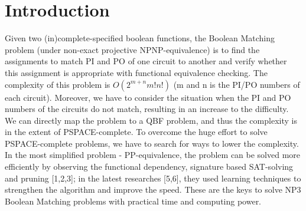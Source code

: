\section{Introduction}
Given two (in)complete-specified boolean functions,
the Boolean Matching problem (under non-exact projective NPNP-equivalence) is to find the assignments to match PI and PO of one circuit to another and verify whether this assignment is appropriate with functional equivalence checking. The complexity of this problem is $O(2^{m+n}m!n!)$ (m and n is the PI/PO numbers of each circuit). Moreover, we have to consider the situation when the PI and PO numbers of the circuits do not match, resulting in an increase to the difficulty. We can directly map the problem to a QBF problem, and thus the complexity is in the extent of PSPACE-complete. To overcome the huge effort to solve PSPACE-complete problems, we have to search for ways to lower the complexity. In the most simplified problem - PP-equivalence, the problem can be solved more efficiently by observing the functional dependency, signature based SAT-solving and pruning [1,2,3]; in the latest researches [5,6], they used learning techniques to strengthen the algorithm and improve the speed. These are the keys to solve NP3 Boolean Matching problems with practical time and computing power.


%
%

